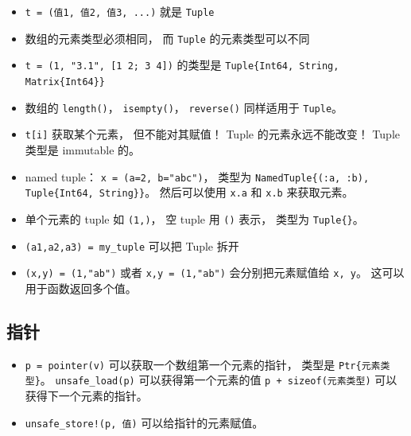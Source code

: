 \begin{itemize}
\item \verb`t = (值1, 值2, 值3, ...)` 就是 \verb`Tuple`
\item 数组的元素类型必须相同， 而 \verb`Tuple` 的元素类型可以不同
\item \verb`t = (1, "3.1", [1 2; 3 4])` 的类型是 \verb`Tuple{Int64, String, Matrix{Int64}}`
\item 数组的 \verb`length()`， \verb`isempty()`， \verb`reverse()` 同样适用于 \verb`Tuple`。
\item \verb`t[i]` 获取某个元素， 但不能对其赋值！ Tuple 的元素永远不能改变！ Tuple 类型是 immutable 的。
\item named tuple： \verb`x = (a=2, b="abc")`， 类型为 \verb`NamedTuple{(:a, :b), Tuple{Int64, String}}`。 然后可以使用 \verb`x.a` 和 \verb`x.b` 来获取元素。
\item 单个元素的 tuple 如 \verb`(1,)`， 空 tuple 用 \verb`()` 表示， 类型为 \verb`Tuple{}`。
\item \verb`(a1,a2,a3) = my_tuple` 可以把 Tuple 拆开
\item \verb`(x,y) = (1,"ab")` 或者 \verb`x,y = (1,"ab")` 会分别把元素赋值给 \verb`x, y`。 这可以用于函数返回多个值。
\end{itemize}

\subsection{指针}
\begin{itemize}
\item \verb`p = pointer(v)` 可以获取一个数组第一个元素的指针， 类型是 \verb`Ptr{元素类型}`。 \verb`unsafe_load(p)` 可以获得第一个元素的值 \verb`p + sizeof(元素类型)` 可以获得下一个元素的指针。
\item \verb`unsafe_store!(p, 值)` 可以给指针的元素赋值。
\end{itemize}

